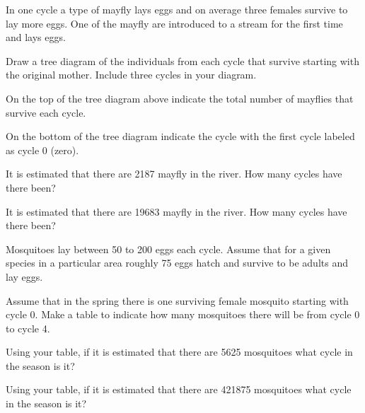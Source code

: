 \begin{problem}
\clearpage

\item In one cycle a type of mayfly lays eggs and on average three
  females survive to lay more eggs. One of the mayfly are introduced
  to a stream for the first time and lays eggs. 
  \begin{subproblem}
  \item Draw a tree diagram of the individuals from each cycle that
    survive starting with the original mother. Include three cycles in
    your diagram.
    \vfill
  \item On the top of the tree diagram above indicate the total number
    of mayflies that survive each cycle.
  \item On the bottom of the tree diagram indicate the cycle with the
    first cycle labeled as cycle 0 (zero).
  \item It is estimated that there are 2187 mayfly in the river. How
    many cycles have there been?
    \vspace{3em}
  \item It is estimated that there are 19683 mayfly in the river. How
    many cycles have there been?
    \vspace{3em}
  \end{subproblem}

\clearpage

\item Mosquitoes lay between 50 to 200 eggs each cycle. Assume that
  for a given species in a particular area roughly 75 eggs hatch and
  survive to be adults and lay eggs.
  \begin{subproblem}
  \item Assume that in the spring there is one surviving female
    mosquito starting with cycle 0. Make a table to indicate how many
    mosquitoes there will be from cycle 0 to cycle 4.
    \vfill
  \item Using your table, if it is estimated that there are 5625
    mosquitoes what cycle in the season is it?
    \vfill
  \item Using your table, if it is estimated that there are 421875
    mosquitoes what cycle in the season is it?
    \vfill
  \end{subproblem}

\end{problem}

\postClass

